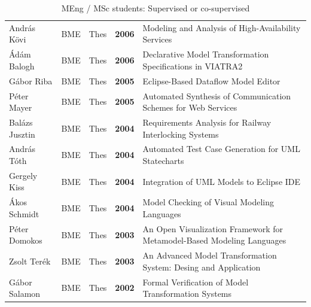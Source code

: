 \documentclass{xetexCV}
\begin{document}
\begin{table}[p]
\begin{tabular}{@{}llllp{9cm}@{}}
Andr\'as K\"ovi & BME & Thes & \textbf{2006} & Modeling and Analysis of High-Availability Services \\ 
\'Ad\'am Balogh & BME & Thes & \textbf{2006} & Declarative Model Transformation Specifications in VIATRA2\\ 
G\'abor Riba & BME & Thes & \textbf{2005} & Eclipse-Based Dataflow Model Editor \\ 
P\'eter Mayer & BME & Thes & \textbf{2005} & Automated Synthesis of Communication Schemes for Web Services \\ 
Bal\'azs Jusztin & BME & Thes & \textbf{2004} & Requirements Analysis for Railway Interlocking Systems\\ 
Andr\'as T\'oth & BME & Thes & \textbf{2004} & Automated Test Case Generation for UML Statecharts\\ 
Gergely Kiss & BME & Thes & \textbf{2004} & Integration of UML Models to Eclipse IDE\\ 
\'Akos Schmidt & BME & Thes & \textbf{2004} & Model Checking of Visual Modeling Languages\\ 
P\'eter Domokos & BME & Thes & \textbf{2003} & An Open Visualization Framework for Metamodel-Based Modeling Languages\\ 
Zsolt Ter\'ek & BME & Thes & \textbf{2003} & An Advanced Model Transformation System: Desing and Application\\ 
G\'abor Salamon & BME & Thes & \textbf{2002} & Formal Verification of Model Transformation Systems\\ 
\bottomrule
\end{tabular}
\caption{MEng / MSc students: Supervised or co-supervised}
\label{tab:msc-supervised}
\end{table}

\end{document}
